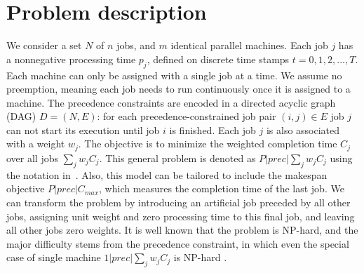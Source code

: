 \section{Problem description} \label{s:problem}
We consider a set $N$ of $n$ jobs, and $m$ identical parallel machines. Each job
$j$ has a nonnegative processing time $p_j$, defined on discrete time stamps $t = 0, 1, 2,
..., T$. Each machine can only be assigned with a single job at a time. We assume no
preemption, meaning each job needs to run continuously once it is assigned to a
machine. The precedence constraints are encoded in a directed acyclic graph
(DAG) $D=(N,E)$: for each precedence-constrained job pair $(i,j) \in E$ job $j$
can not start its execution until job $i$ is finished. Each job $j$ is also associated with a
weight $w_j$. The objective is to minimize the weighted completion time $C_j$
over all jobs $\sum_j w_j C_j$. This general problem is denoted as  $P|prec|\sum_j w_jC_j$
using the notation in~\cite{graham1979optimization}. Also, this model can be tailored to include the makespan objective $P|prec|C_{max}$, which measures the completion time of the last job. We can transform the problem by introducing an artificial job preceded by all other jobs, assigning unit weight and zero processing time to this final job, and leaving all other jobs zero weights. It is well known that the problem is NP-hard, and the major difficulty stems from the precedence constraint, in which even the special case of single machine $1|prec|\sum_j w_jC_j$ is NP-hard \cite{lenstra1978complexity}.